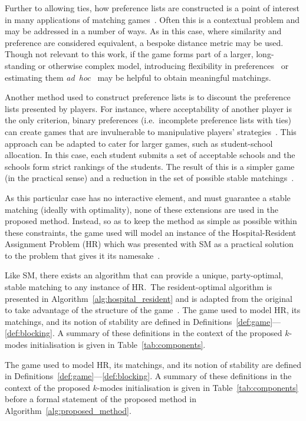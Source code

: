 Further to allowing ties, how preference lists are constructed is a point of
interest in many applications of matching games~\cite{Iwama2008,Manlove2002}.
Often this is a contextual problem and may be addressed in a number of ways. As
in this case, where similarity and preference are considered equivalent, a
bespoke distance metric may be used. Though not relevant to this work, if the
game forms part of a larger, long-standing or otherwise complex model,
introducing flexibility in preferences~\cite{Agarwal2017,Menzel2015} or
estimating them \emph{ad~hoc}~\cite{Rastegari2016} may be helpful to obtain
meaningful matchings.

Another method used to construct preference lists is to discount the preference
lists presented by players. For instance, where acceptability of another player
is the only criterion, binary preferences (i.e.\ incomplete preference lists
with ties) can create games that are invulnerable to manipulative players'
strategies~\cite{Bogomolnaia2004}. This approach can be adapted to cater for
larger games, such as student-school allocation. In this case, each student
submits a set of acceptable schools and the schools form strict rankings of the
students. The result of this is a simpler game (in the practical sense) and a
reduction in the set of possible stable
matchings~\cite{Haeringer2014,Haeringer2019}.

As this particular case has no interactive element, and must guarantee a stable
matching (ideally with optimality), none of these extensions are used in the
proposed method. Instead, so as to keep the method as simple as possible within
these constraints, the game used will model an instance of the Hospital-Resident
Assignment Problem (HR) which was presented with SM as a practical solution to
the problem that gives it its namesake~\cite{Gale1962}.

Like SM, there exists an algorithm that can provide a unique, party-optimal,
stable matching to any instance of HR.\ The resident-optimal algorithm is
presented in Algorithm~\ref{alg:hospital_resident} and is adapted from the
original to take advantage of the structure of the game~\cite{Roth1984}. The
game used to model HR, its matchings, and its notion of stability are defined in
Definitions~\ref{def:game}---\ref{def:blocking}. A summary of these definitions
in the context of the proposed \(k\)-modes initialisation is given in
Table~\ref{tab:components}.

The game used to model HR, its matchings, and its notion of stability are
defined in Definitions~\ref{def:game}---\ref{def:blocking}. A summary of these
definitions in the context of the proposed \(k\)-modes initialisation is given
in Table~\ref{tab:components} before a formal statement of the proposed method
in Algorithm~\ref{alg:proposed_method}.

